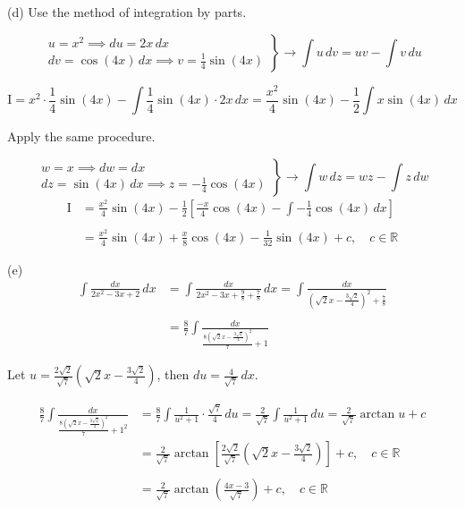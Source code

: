 \documentclass{article}
\begin{document}
\noindent (d) Use the method of integration by parts.

\[
\left.\begin{array}{c}
u=x^2\implies du=2x\,dx\\[1em]
\displaystyle dv=\cos(4x)\,dx\implies v=\frac14\sin(4x)
\end{array}\right\}\rightarrow\int u\,dv=uv-\int v\,du
\]

\[\mathrm{I}=x^2\cdot\frac14\sin(4x)-\int\frac14\sin(4x)\cdot2x\,dx=\frac{x^2}4\sin(4x)-\frac12\int x\sin(4x)\,dx\]

\hfill

\noindent Apply the same procedure.

\[
\left.\begin{array}{c}
w=x\implies dw=dx\\[1em]
\displaystyle dz=\sin(4x)\,dx\implies z=-\frac14\cos(4x)
\end{array}\right\}\rightarrow\int w\,dz=wz-\int z\,dw
\]
\begin{align*}\mathrm{I}&=\frac{x^2}4\sin(4x)-\frac12\left[\frac{-x}4\cos(4x)-\int-\frac14\cos(4x)\,dx\right]\\\\&=\boxed{\frac{x^2}4\sin(4x)+\frac x8\cos(4x)-\frac1{32}\sin(4x)+c,\quad c\in\mathbb{R}}\end{align*}

\hfill

\noindent (e)
\begin{align*}\int\frac{dx}{2x^2-3x+2}\,dx&=\int\frac{dx}{\displaystyle2x^2-3x+\frac98+\frac78}\,dx=\int\frac{dx}{\displaystyle\left(\sqrt2x-\frac{3\sqrt2}4\right)^2+\frac78}\\\\&=\frac87\int\frac{dx}{\displaystyle\frac{8\left(\sqrt2x-\frac{3\sqrt2}4\right)^2}7+1}\end{align*}

\hfill

\noindent Let $\displaystyle u=\frac{2\sqrt2}{\sqrt7}\left(\sqrt2x-\frac{3\sqrt2}4\right)$, then $\displaystyle du=\frac4{\sqrt7}\,dx$.

\begin{align*}\frac87\int\frac{dx}{\displaystyle\frac{8\left(\sqrt2x-\frac{3\sqrt2}4\right)^2}7+1^2}&=\frac87\int\frac{1}{u^2+1}\cdot\frac{\sqrt7}4\,du=\frac2{\sqrt7}\int\frac1{u^2+1}\,du=\frac2{\sqrt7}\arctan u+c\\&=\frac2{\sqrt7}\arctan\left[\frac{2\sqrt2}{\sqrt7}\left(\sqrt2x-\frac{3\sqrt2}4\right)\right]+c,\quad c\in\mathbb{R}\\\\&=\boxed{\frac2{\sqrt7}\arctan\left(\frac{4x-3}{\sqrt7}\right)+c,\quad c\in\mathbb{R}}\end{align*}
\end{document}
